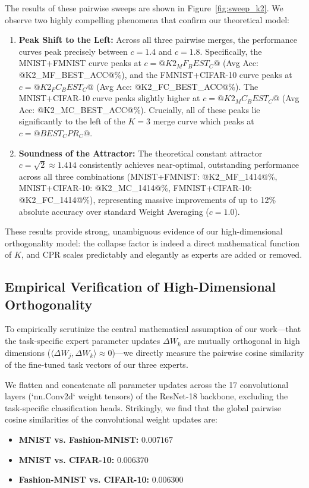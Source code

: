 \documentclass{article}
\theoremstyle{plain}
\theoremstyle{definition}
\theoremstyle{remark}
\begin{document}
The results of these pairwise sweeps are shown in Figure~\ref{fig:sweep_k2}. We observe two highly compelling phenomena that confirm our theoretical model:
\begin{enumerate}
\item \textbf{Peak Shift to the Left:} Across all three pairwise merges, the performance curves peak precisely between $c = 1.4$ and $c = 1.8$. Specifically, the MNIST+FMNIST curve peaks at $c = @K2_MF_BEST_C@$ (Avg Acc: @K2_MF_BEST_ACC@\%), and the FMNIST+CIFAR-10 curve peaks at $c = @K2_FC_BEST_C@$ (Avg Acc: @K2_FC_BEST_ACC@\%). The MNIST+CIFAR-10 curve peaks slightly higher at $c = @K2_MC_BEST_C@$ (Avg Acc: @K2_MC_BEST_ACC@\%). Crucially, all of these peaks lie significantly to the left of the $K=3$ merge curve which peaks at $c = @BEST_CPR_C@$.
\item \textbf{Soundness of the Attractor:} The theoretical constant attractor $c = \sqrt{2} \approx 1.414$ consistently achieves near-optimal, outstanding performance across all three combinations (MNIST+FMNIST: @K2_MF_1414@\%, MNIST+CIFAR-10: @K2_MC_1414@\%, FMNIST+CIFAR-10: @K2_FC_1414@\%), representing massive improvements of up to 12\% absolute accuracy over standard Weight Averaging ($c = 1.0$).
\end{enumerate}

These results provide strong, unambiguous evidence of our high-dimensional orthogonality model: the collapse factor is indeed a direct mathematical function of $K$, and CPR scales predictably and elegantly as experts are added or removed.

\subsection{Empirical Verification of High-Dimensional Orthogonality}
\label{subsec:orthogonality}

To empirically scrutinize the central mathematical assumption of our work---that the task-specific expert parameter updates $\Delta W_k$ are mutually orthogonal in high dimensions ($\langle \Delta W_j, \Delta W_k \rangle \approx 0$)---we directly measure the pairwise cosine similarity of the fine-tuned task vectors of our three experts. 

We flatten and concatenate all parameter updates across the 17 convolutional layers (`nn.Conv2d` weight tensors) of the ResNet-18 backbone, excluding the task-specific classification heads. Strikingly, we find that the global pairwise cosine similarities of the convolutional weight updates are:
\begin{itemize}
\item \textbf{MNIST vs. Fashion-MNIST:} $0.007167$
\item \textbf{MNIST vs. CIFAR-10:} $0.006370$
\item \textbf{Fashion-MNIST vs. CIFAR-10:} $0.006300$
\end{itemize}
\end{document}

